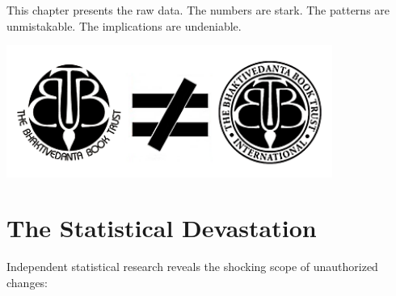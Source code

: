 \documentclass[11pt,twoside]{book}
\begin{document}
This chapter presents the raw data. The numbers are stark. The patterns are unmistakable. The implications are undeniable.

\vfill

\begin{center}
\includegraphics[width=0.8\textwidth]{bbti.png}
\end{center}
\vspace{0.5cm}
\section*{The Statistical Devastation}
\label{sec:orgb4bffe8}

Independent statistical research reveals the shocking scope of unauthorized changes:
\end{document}
